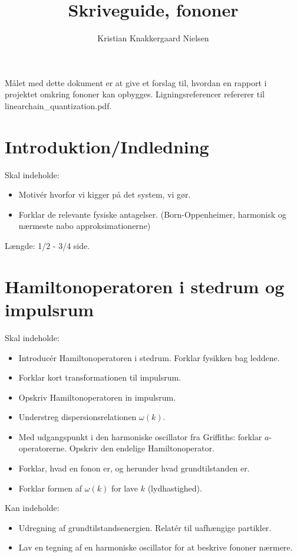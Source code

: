 \documentclass[10pt]{article}
\title{Skriveguide, fononer}
\author{Kristian Knakkergaard Nielsen}
\begin{document}
\maketitle
Målet med dette dokument er at give et forslag til, hvordan en rapport i projektet omkring fononer kan opbygges. Ligningsreferencer refererer til linearchain\_quantization.pdf.

\section{Introduktion/Indledning}
Skal indeholde:
\begin{itemize}
\item Motivér hvorfor vi kigger på det system, vi gør. 
\item Forklar de relevante fysiske antagelser. (Born-Oppenheimer, harmonisk og nærmeste nabo approksimationerne)
\end{itemize}

Længde: 1/2 - 3/4 side. 

\section{Hamiltonoperatoren i stedrum og impulsrum}
Skal indeholde:
\begin{itemize}
\item Introducér Hamiltonoperatoren i stedrum. Forklar fysikken bag leddene.
\item Forklar kort transformationen til impulsrum. 
\item Opskriv Hamiltonoperatoren in impulsrum.
\item Understreg dispersionsrelationen $\omega(k)$. 
\item Med udgangspunkt i den harmoniske oscillator fra Griffiths: forklar $a$-operatorerne. Opskriv den endelige Hamiltonoperator.
\item Forklar, hvad en fonon er, og herunder hvad grundtilstanden er.
\item Forklar formen af $\omega(k)$ for lave $k$ (lydhastighed).
\end{itemize}

Kan indeholde:
\begin{itemize}
\item Udregning af grundtilstandsenergien. Relatér til uafhængige partikler. 
\item Lav en tegning af en harmoniske oscillator for at beskrive fononer nærmere.
\end{itemize}
\end{document}
